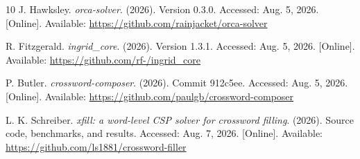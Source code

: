 \documentclass[conference]{IEEEtran}
\begin{document}
\begin{thebibliography}{10}
 J. Hawksley. \textit{orca-solver}. (2026). Version 0.3.0. Accessed: Aug. 5, 2026. [Online]. Available: \url{https://github.com/rainjacket/orca-solver}

 R. Fitzgerald. \textit{ingrid\_core}. (2026). Version 1.3.1. Accessed: Aug. 5, 2026. [Online]. Available: \url{https://github.com/rf-/ingrid_core}

 P. Butler. \textit{crossword-composer}. (2026). Commit 912c5ee. Accessed: Aug. 5, 2026. [Online]. Available: \url{https://github.com/paulgb/crossword-composer}

 L. K. Schreiber. \textit{xfill: a word-level CSP solver for crossword filling}. (2026). Source code, benchmarks, and results. Accessed: Aug. 7, 2026. [Online]. Available: \url{https://github.com/ls1881/crossword-filler}

\end{thebibliography}
\end{document}
